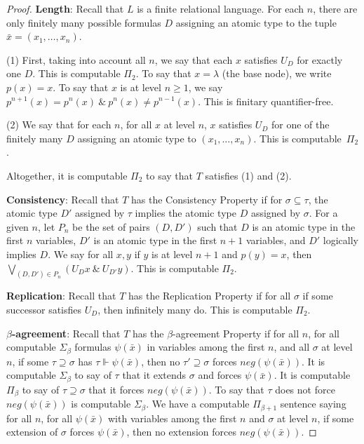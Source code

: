 \documentclass{article}
\begin{document}
\begin{proof}

\noindent
\textbf{Length}:  Recall that $L$ is a finite relational language.  For each $n$, there are only finitely many possible formulas $D$ assigning an atomic type to the tuple $\bar{x} = (x_1,\ldots,x_n)$.  

\noindent
(1)  First, taking into account all $n$, we say that each $x$ satisfies $U_D$ for exactly one $D$.  This is computable $\Pi_2$.  To say that $x = \lambda$ (the base node), we write $p(x) = x$.  To say that $x$ is at level $n\geq 1$, 
we say $p^{n+1}(x) = p^n(x) \ \&\ p^n(x) \not= p^{n-1}(x)$.  This is finitary quantifier-free.           

\noindent
(2)  We say that for each $n$, for all $x$ at level $n$, $x$ satisfies $U_D$ for one of the finitely many $D$  assigning an atomic type to $(x_1,\ldots,x_n)$.  This is computable~$\Pi_2$.

\noindent
Altogether, it is computable $\Pi_2$ to say that $T$ satisfies (1) and (2).      

\bigskip
\noindent
\textbf{Consistency}:  Recall that $T$ has the Consistency Property if for $\sigma\subseteq\tau$, the atomic type $D'$ assigned by $\tau$ implies the atomic type $D$ assigned by $\sigma$.  For a given $n$, let $P_n$ be the set of pairs $(D,D')$ such that $D$ is an atomic type in the first $n$ variables, $D'$ is an atomic type in the first $n+1$ variables, and $D'$ logically implies $D$.  We say for all $x,y$ if $y$ is at level $n+1$ and $p(y) = x$, then $\bigvee_{(D,D')\in P_n} (U_Dx\ \&\ U_{D'}y)$.  This is computable $\Pi_2$.    

\bigskip
\noindent
\textbf{Replication}:  Recall that $T$ has the Replication Property if for all $\sigma$ if some successor satisfies $U_D$, then infinitely many do.  This is computable $\Pi_2$.

\bigskip
\noindent
\textbf{$\beta$-agreement}:  Recall that $T$ has the $\beta$-agreement Property if for all $n$, for all computable $\Sigma_\beta$ formulas $\psi(\bar{x})$ in variables among the first $n$, and all $\sigma$ at level $n$, if some $\tau\supseteq\sigma$ has $\tau\Vdash\psi(\bar{x})$, then no $\tau'\supseteq\sigma$ forces $neg(\psi(\bar{x}))$. 
It is computable $\Sigma_\beta$ to say of $\tau$ that it extends $\sigma$ and forces $\psi(\bar{x})$.  It is computable $\Pi_{\beta}$ to say of $\tau\supseteq\sigma$ that it forces $neg(\psi(\bar{x}))$.  To say that $\tau$ does not force $neg(\psi(\bar{x}))$ is computable $\Sigma_\beta$.  We have a computable $\Pi_{\beta+1}$ sentence saying for all $n$, for all $\psi(\bar{x})$ with variables among the first $n$ and $\sigma$ at level $n$, if some extension of $\sigma$ forces $\psi(\bar{x})$, then no extension forces $neg(\psi(\bar{x}))$.    


\end{proof}
\end{document}

